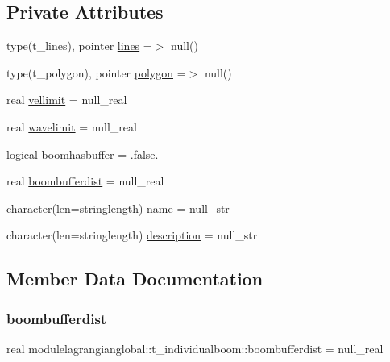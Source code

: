 \subsection*{Private Attributes}
\begin{DoxyCompactItemize}
\item 
type(t\+\_\+lines), pointer \mbox{\hyperlink{structmodulelagrangianglobal_1_1t__individualboom_a3a4b7d09817d7901ecdfc41b33be1ede}{lines}} =$>$ null()
\item 
type(t\+\_\+polygon), pointer \mbox{\hyperlink{structmodulelagrangianglobal_1_1t__individualboom_abcc7c906046640513441c69416a0c234}{polygon}} =$>$ null()
\item 
real \mbox{\hyperlink{structmodulelagrangianglobal_1_1t__individualboom_ab55dcc4c46d02fc7c26d1273bcd7aa83}{vellimit}} = null\+\_\+real
\item 
real \mbox{\hyperlink{structmodulelagrangianglobal_1_1t__individualboom_a9fa57c768a1554f4a7ebb1958625e963}{wavelimit}} = null\+\_\+real
\item 
logical \mbox{\hyperlink{structmodulelagrangianglobal_1_1t__individualboom_a994ebae3c6de075b0eedaa61adfa0cc4}{boomhasbuffer}} = .false.
\item 
real \mbox{\hyperlink{structmodulelagrangianglobal_1_1t__individualboom_a61c5df62a02f365d057e948307a0f459}{boombufferdist}} = null\+\_\+real
\item 
character(len=stringlength) \mbox{\hyperlink{structmodulelagrangianglobal_1_1t__individualboom_ac7e0e3d12f362f5b566bcb5670171791}{name}} = null\+\_\+str
\item 
character(len=stringlength) \mbox{\hyperlink{structmodulelagrangianglobal_1_1t__individualboom_a9593cf7c810be2633c927153d70176ad}{description}} = null\+\_\+str
\end{DoxyCompactItemize}


\subsection{Member Data Documentation}
\mbox{\label{structmodulelagrangianglobal_1_1t__individualboom_a61c5df62a02f365d057e948307a0f459}} 
\subsubsection{\texorpdfstring{boombufferdist}{boombufferdist}}
{\footnotesize\ttfamily real modulelagrangianglobal\+::t\+\_\+individualboom\+::boombufferdist = null\+\_\+real\hspace{0.3cm}{\ttfamily [private]}}

